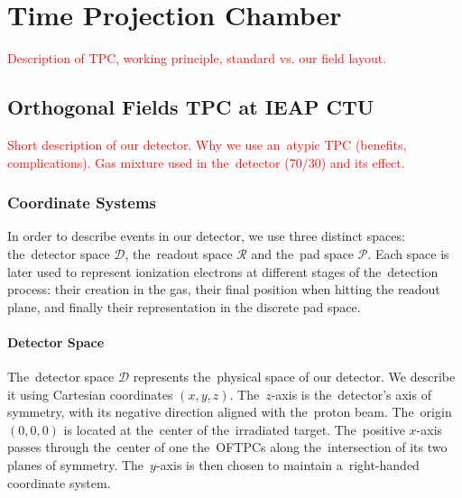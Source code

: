 \chapter{Time Projection Chamber}
\label{sec:tpc}
	\textcolor{red}{Description of TPC, working principle, standard vs. our field layout.}
	
	\section{Orthogonal Fields TPC at IEAP CTU}
		\textcolor{red}{Short description of our detector. Why we use an~atypic TPC (benefits, complications). Gas mixture used in the~detector (70/30) and its effect.}
	
	\subsection{Coordinate Systems}
	\label{sec:coor}
		In order to describe events in our detector, we use three distinct spaces: the~detector space $\mathcal{D}$, the~readout space $\mathcal{R}$ and the~pad space $\mathcal{P}$. Each space is later used to represent ionization electrons at different stages of the~detection process: their creation in the gas, their final position when hitting the readout plane, and finally their representation in the discrete pad space.
	
	\subsubsection{Detector Space}
		The~detector space $\mathcal{D}$ represents the~physical space of our detector. We describe it using Cartesian coordinates $(x,y,z)$. The~$z$-axis is the~detector's axis of symmetry, with its negative direction aligned with the~proton beam. The~origin $(0,0,0)$ is located at the~center of the~irradiated target. The~positive $x$\nobreakdash-axis passes through the~center of one the~\ac{OFTPC}s along the~intersection of its two planes of symmetry. The~$y$\nobreakdash-axis is then chosen to maintain a~right-handed coordinate system.
		
